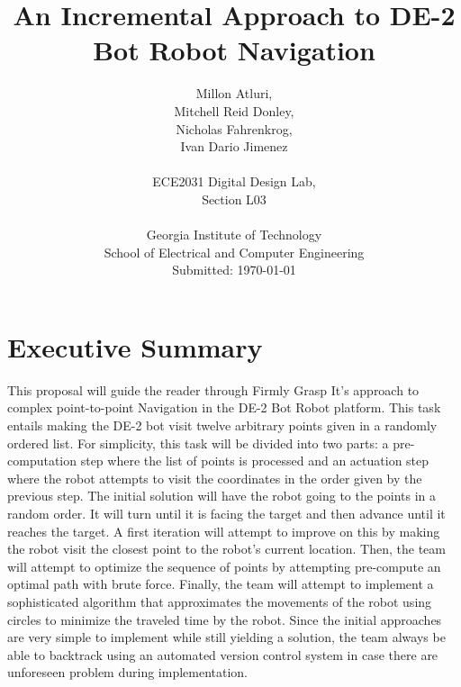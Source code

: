 \documentclass[12pt,conference,onecolumn]{IEEEtran} %
\begin{document}
\title{\vspace*{30mm}
An Incremental Approach to DE-2 Bot Robot Navigation}

\author{
Millon Atluri,\\
Mitchell Reid Donley,\\
Nicholas Fahrenkrog,\\
Ivan Dario Jimenez

\vspace*{30mm}\\
ECE2031 Digital Design Lab,\\
Section L03\\
\vspace*{30mm}\\
Georgia Institute of Technology\\
School of Electrical and Computer Engineering\\
Submitted: \today
}

\maketitle

\clearpage

\section{Executive Summary}
This proposal will guide the reader through Firmly Grasp It's approach to complex point-to-point Navigation in the DE-2 Bot Robot platform. This task entails making the DE-2 bot visit twelve arbitrary points given in a randomly ordered list. For simplicity, this task will be divided into two parts: a pre-computation step where the list of points is processed and an actuation step where the robot attempts to visit the coordinates in the order given by the previous step. The initial solution will have the robot going to the points in a random order. It will turn until it is facing the target and then advance until it reaches the target. A first iteration will attempt to improve on this by making the robot visit the closest point to the robot's current location. Then, the team will attempt to optimize the sequence of points by attempting pre-compute an optimal path with brute force. Finally, the team will attempt to implement a sophisticated algorithm that approximates the movements of the robot using circles to minimize the traveled time by the robot. Since the initial approaches are very simple to implement while still yielding a solution, the team always be able to backtrack using an automated version control system in case there are unforeseen problem during implementation.
\end{document}
